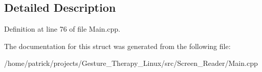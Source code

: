 \subsection{Detailed Description}


Definition at line 76 of file Main.\+cpp.



The documentation for this struct was generated from the following file\+:\begin{DoxyCompactItemize}
\item 
/home/patrick/projects/\+Gesture\+\_\+\+Therapy\+\_\+\+Linux/src/\+Screen\+\_\+\+Reader/Main.\+cpp\end{DoxyCompactItemize}
